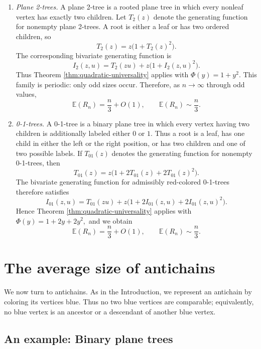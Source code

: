 \documentclass[10pt,a4paper]{amsart}
\theoremstyle{remark}
\begin{document}
\begin{enumerate}
The same two-coloring of rooted plane trees was considered by Dimitrov,
Fox, Hadaway, Tharp, and Wagner~\cite{DimitrovFoxHadawayTharpWagner},
who studied its enumeration within a general framework for local
parent--child coloring rules, rather than the asymptotic size of the red
set considered here.

\item \emph{Plane 2-trees.}
A plane 2-tree is a rooted plane tree in which every nonleaf vertex has exactly two children. Let $T_2(z)$ denote the generating function for nonempty plane 2-trees. A root is either a leaf or has two ordered children, so
\[
T_2(z)=z\bigl(1+T_2(z)^2\bigr).
\]
The corresponding bivariate generating function is
\[
I_2(z,u)
=
T_2(zu)+z\bigl(1+I_2(z,u)^2\bigr).
\]
Thus Theorem \ref{thm:quadratic-universality} applies with
$
\Phi(y)=1+y^2.
$ 
This family is periodic: only odd sizes occur. Therefore, as $n\to\infty$ through odd values,
\[
\mathbb E(R_n)=\frac{n}{3}+O(1),
\qquad
\mathbb E(R_n)\sim\frac{n}{3}.
\]

\item \emph{0-1-trees.}
A 0-1-tree is a binary plane tree in which every vertex having two children is additionally labeled either $0$ or $1$. Thus a root is a leaf, has one child in either the left or the right position, or has two children and one of two possible labels. If $T_{01}(z)$ denotes the generating function for nonempty 0-1-trees, then
\[
T_{01}(z)
=
z\bigl(1+2T_{01}(z)+2T_{01}(z)^2\bigr).
\]
The bivariate generating function for admissibly red-colored 0-1-trees therefore satisfies
\[
I_{01}(z,u)
=
T_{01}(zu)
+z\bigl(1+2I_{01}(z,u)+2I_{01}(z,u)^2\bigr).
\]
Hence Theorem \ref{thm:quadratic-universality} applies with
$
\Phi(y)=1+2y+2y^2,
$
and we obtain
\[
\mathbb E(R_n)=\frac{n}{3}+O(1),
\qquad
\mathbb E(R_n)\sim\frac{n}{3}.
\]

\end{enumerate}


\section{The average size of antichains}
\label{sec:antichains}

We now turn to antichains.  As in the Introduction, we represent an antichain by coloring its vertices blue.  Thus no two blue vertices are comparable; equivalently, no blue vertex is an ancestor or a descendant of another blue vertex.

\subsection{An example: Binary plane trees}
\label{sec:binaryBlue}
\end{document}
